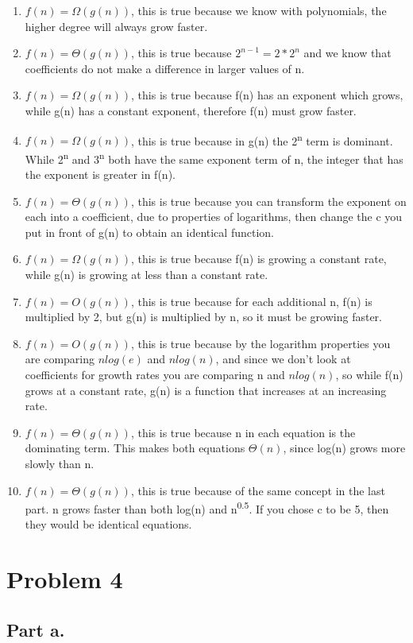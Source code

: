 \documentclass[]{article}
\begin{document}
\begin{enumerate}
\def\labelenumi{\alph{enumi})}
\item
  \(f(n) = \Omega(g(n))\), this is true because we know with
  polynomials, the higher degree will always grow faster.
\item
  \(f(n) = \Theta(g(n))\), this is true because \(2^{n-1} = 2 * 2^n\)
  and we know that coefficients do not make a difference in larger
  values of n.
\item
  \(f(n) = \Omega(g(n))\), this is true because f(n) has an exponent
  which grows, while g(n) has a constant exponent, therefore f(n) must
  grow faster.
\item
  \(f(n) = \Omega(g(n))\), this is true because in g(n) the
  2\textsuperscript{n} term is dominant. While 2\textsuperscript{n} and
  3\textsuperscript{n} both have the same exponent term of n, the
  integer that has the exponent is greater in f(n).
\item
  \(f(n) = \Theta(g(n))\), this is true because you can transform the
  exponent on each into a coefficient, due to properties of logarithms,
  then change the c you put in front of g(n) to obtain an identical
  function.
\item
  \(f(n) = \Omega(g(n))\), this is true because f(n) is growing a
  constant rate, while g(n) is growing at less than a constant rate.
\item
  \(f(n) = O(g(n))\), this is true because for each additional n, f(n)
  is multiplied by 2, but g(n) is multiplied by n, so it must be growing
  faster.
\item
  \(f(n) = O(g(n))\), this is true because by the logarithm properties
  you are comparing \(nlog(e)\) and \(nlog(n)\), and since we don't look
  at coefficients for growth rates you are comparing n and \(nlog(n)\),
  so while f(n) grows at a constant rate, g(n) is a function that
  increases at an increasing rate.
\item
  \(f(n) = \Theta(g(n))\), this is true because n in each equation is
  the dominating term. This makes both equations \(\Theta(n)\), since
  log(n) grows more slowly than n.
\item
  \(f(n) = \Theta(g(n))\), this is true because of the same concept in
  the last part. n grows faster than both log(n) and
  n\textsuperscript{0.5}. If you chose c to be 5, then they would be
  identical equations.
\end{enumerate}

\pagebreak

\section{Problem 4}\label{problem-4}

\subsection{Part a.}\label{part-a.}
\end{document}
